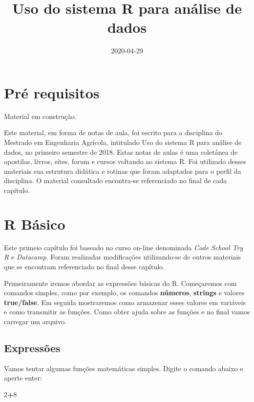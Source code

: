 \documentclass[
]{book}
\title{Uso do sistema R para análise de dados}
\author{}
\date{\vspace{-2.5em}2020-04-29}
\newenvironment{Shaded}{\begin{snugshade}}{\end{snugshade}}
\newcommand{\DecValTok}[1]{\textcolor[rgb]{0.00,0.00,0.81}{#1}}
\newcommand{\OperatorTok}[1]{\textcolor[rgb]{0.81,0.36,0.00}{\textbf{#1}}}
\begin{document}
\maketitle

{
\setcounter{tocdepth}{1}
\tableofcontents
}
\hypertarget{pruxe9-requisitos}{%
\chapter{Pré requisitos}\label{pruxe9-requisitos}}

Material em construção.

Este material, em forma de notas de aula, foi escrito para a disciplina do Mestrado em Engenharia Agrícola, intitulado Uso do sistema R para análise de dados, no primeiro semestre de 2018.
Estas notas de aulas é uma coletânea de apostilas, livros, sites, forum e cursos voltando ao sistema R. Foi utilizado desses materiais sua estrutura didática e rotinas que foram adaptados para o perfil da disciplina.
O material consultado encontra-se referenciado no final de cada capitulo.

\hypertarget{r-buxe1sico}{%
\chapter{R Básico}\label{r-buxe1sico}}

Este primeio capítulo foi baseado no curso on-line denominada \emph{Code School Try R} e \emph{Datacamp}. Foram realizadas modificações utilizando-se de outros materiais que se encontram referenciado no final desse capítulo.

Primeiramente iremos abordar as expressões básicas do R.
Começaremos com comandos simples, como por exemplo, os comandos \textbf{números}, \textbf{strings} e valores \textbf{true/false}. Em seguida mostraremos como armazenar esses valores em variáveis e como transmitir as funções. Como obter ajuda sobre as funções e no final vamos carregar um arquivo.

\hypertarget{expressuxf5es}{%
\section{Expressões}\label{expressuxf5es}}

Vamos tentar algumas funções matemáticas simples. Digite o comando abaixo e aperte enter:

\begin{Shaded}
\begin{Highlighting}[]
\DecValTok{2}\OperatorTok{+}\DecValTok{8}
\end{Highlighting}
\end{Shaded}
\end{document}

